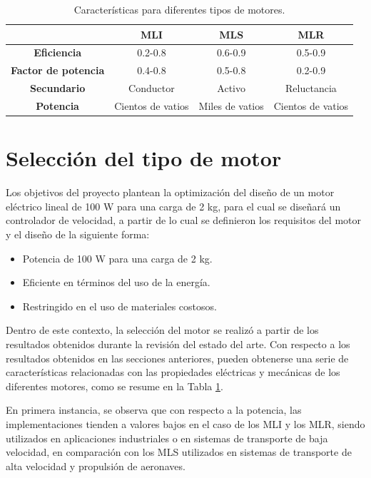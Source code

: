\begin{table}[hbtp]
\caption{Características para diferentes tipos de motores.}
\centering
\begin{tabular}{c c c c}
& \textbf{MLI} & \textbf{MLS} & \textbf{MLR}\\
\hline
\textbf{Eficiencia} & 0.2-0.8 & 0.6-0.9 & 0.5-0.9 \\
\textbf{Factor de potencia} & 0.4-0.8 & 0.5-0.8 & 0.2-0.9 \\
\textbf{Secundario} & Conductor & Activo & Reluctancia\\
\textbf{Potencia} & Cientos de vatios & Miles de vatios & Cientos de vatios \\
\end{tabular}
\label{motorfeatures}
\end{table}

\section{Selección del tipo de motor}
Los objetivos del proyecto plantean la optimización del diseño de un motor eléctrico lineal de 100 W para una carga de 2 kg, para el cual se diseñará un controlador de velocidad, a partir de lo cual se definieron los requisitos del motor y el diseño de la siguiente forma:

\begin{itemize}
\item Potencia de 100 W para una carga de 2 kg.
\item Eficiente en términos del uso de la energía.
\item Restringido en el uso de materiales costosos.
\end{itemize}

Dentro de este contexto, la selección del motor se realizó a partir de los resultados obtenidos durante la revisión del estado del arte. Con respecto a los resultados obtenidos en las secciones anteriores, pueden obtenerse una serie de características relacionadas con las propiedades eléctricas y mecánicas de los diferentes motores, como se resume en la Tabla \ref{motorfeatures}. 

En primera instancia, se observa que con respecto a la potencia, las implementaciones tienden a valores bajos en el caso de los MLI y los MLR, siendo utilizados en aplicaciones industriales o en sistemas de transporte de baja velocidad, en comparación con los MLS utilizados en sistemas de transporte de alta velocidad y propulsión de aeronaves. 

